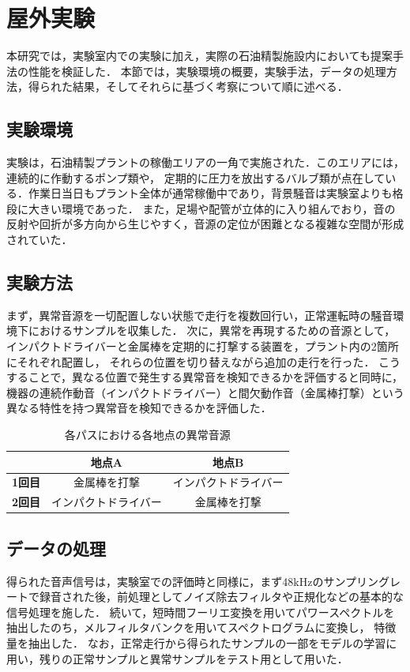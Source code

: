 \documentclass[../main]{subfiles}
\begin{document}
\section{屋外実験}
\label{sec:outdoor_experiment}
本研究では，実験室内での実験に加え，実際の石油精製施設内においても提案手法の性能を検証した．
本節では，実験環境の概要，実験手法，データの処理方法，得られた結果，そしてそれらに基づく考察について順に述べる．
\subsection{実験環境}
\label{subsec:vexp_ci_environment}
実験は，石油精製プラントの稼働エリアの一角で実施された．このエリアには，連続的に作動するポンプ類や，
定期的に圧力を放出するバルブ類が点在している．作業日当日もプラント全体が通常稼働中であり，背景騒音は実験室よりも格段に大きい環境であった．
また，足場や配管が立体的に入り組んでおり，音の反射や回折が多方向から生じやすく，音源の定位が困難となる複雑な空間が形成されていた．
\subsection{実験方法}
\label{subsec:vexp_ci_method}

まず，異常音源を一切配置しない状態で走行を複数回行い，正常運転時の騒音環境下におけるサンプルを収集した．
次に，異常を再現するための音源として，インパクトドライバーと金属棒を定期的に打撃する装置を，プラント内の2箇所にそれぞれ配置し，
それらの位置を切り替えながら追加の走行を行った．
こうすることで，異なる位置で発生する異常音を検知できるかを評価すると同時に，
機器の連続作動音（インパクトドライバー）と間欠動作音（金属棒打撃）という異なる特性を持つ異常音を検知できるかを評価した．

\begin{table}[htbp]
  \centering
  \caption{各パスにおける各地点の異常音源}
  \label{tab:abnormal_sound_jp}
  \begin{tabular}{c|c|c}
  \hline
   & \textbf{地点A} & \textbf{地点B} \\ \hline
  \textbf{1回目} & 金属棒を打撃 & インパクトドライバー \\
  \textbf{2回目} & インパクトドライバー & 金属棒を打撃 \\ \hline
  \end{tabular}
\end{table}

\subsection{データの処理}
\label{subsec:vexp_ci_processing}
得られた音声信号は，実験室での評価時と同様に，まず48kHzのサンプリングレートで録音された後，前処理としてノイズ除去フィルタや正規化などの基本的な信号処理を施した．
続いて，短時間フーリエ変換を用いてパワースペクトルを抽出したのち，メルフィルタバンクを用いてスペクトログラムに変換し，
特徴量を抽出した．
なお，正常走行から得られたサンプルの一部をモデルの学習に用い，残りの正常サンプルと異常サンプルをテスト用として用いた．
\end{document}
